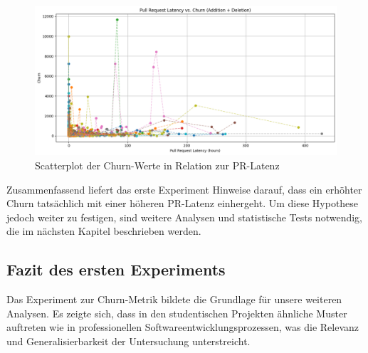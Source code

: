\begin{figure}[th]
\centering
\includegraphics[width=\textwidth]{Figures/pr-latency-churn-added-plus-deleted.png}
\decoRule
\caption{Scatterplot der Churn-Werte in Relation zur PR-Latenz}
\label{fig:pr-latency-churn-added-plus-deleting}
\end{figure}


Zusammenfassend liefert das erste Experiment Hinweise darauf, dass ein erhöhter Churn tatsächlich mit einer höheren PR-Latenz einhergeht. Um diese Hypothese jedoch weiter zu festigen, sind weitere Analysen und statistische Tests notwendig, die im nächsten Kapitel beschrieben werden.


\subsection{Fazit des ersten Experiments}

Das Experiment zur Churn-Metrik bildete die Grundlage für unsere weiteren Analysen. Es zeigte sich, dass in den studentischen Projekten ähnliche Muster auftreten wie in professionellen Softwareentwicklungsprozessen, was die Relevanz und Generalisierbarkeit der Untersuchung unterstreicht.
